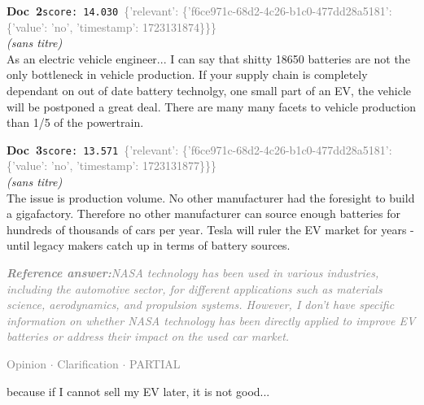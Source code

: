 \documentclass[a4paper,11pt]{article}
\begin{document}
\begin{docenv}
{\footnotesize\textcolor{doccolor}{\textbf{Doc~2}}}\hfill{\tiny\texttt{score:~14.030}}\ {\tiny\textcolor{gray}{\{'relevant': \{'f6ce971c-68d2-4c26-b1c0-477dd28a5181': \{'value': 'no', 'timestamp': 1723131874\}\}\}}}\\[3pt]
{\small\textit{(sans titre)}}\\[2pt]
\vspace{2pt}
{\footnotesize 
As an electric vehicle engineer... I can say that shitty 18650 batteries are not the only bottleneck in vehicle production. If your supply chain is completely dependant on out of date battery technolgy, one small part of an EV,  the vehicle will be postponed a great deal. There are many many facets to vehicle production than 1/5 of the powertrain.}
\end{docenv}
\begin{docenv}
{\footnotesize\textcolor{doccolor}{\textbf{Doc~3}}}\hfill{\tiny\texttt{score:~13.571}}\ {\tiny\textcolor{gray}{\{'relevant': \{'f6ce971c-68d2-4c26-b1c0-477dd28a5181': \{'value': 'no', 'timestamp': 1723131877\}\}\}}}\\[3pt]
{\small\textit{(sans titre)}}\\[2pt]
\vspace{2pt}
{\footnotesize 
The issue is production volume.   No other manufacturer had the foresight to build a gigafactory.   Therefore no other manufacturer can source enough batteries for hundreds of thousands of cars per year.   Tesla will ruler the EV market for years - until legacy makers catch up in terms of battery sources.}
\end{docenv}
\begin{refanswerenv}
{\footnotesize\textit{\textcolor{gray}{\textbf{Reference answer:}\enspace NASA technology has been used in various industries, including the automotive sector, for different applications such as materials science, aerodynamics, and propulsion systems. However, I don't have specific information on whether NASA technology has been directly applied to improve EV batteries or address their impact on the used car market.}}}
\end{refanswerenv}
\vspace{0.5em}
\hfill{\tiny\textcolor{gray}{Opinion $\cdot$ Clarification $\cdot$ PARTIAL}}
\begin{userbubble}
because if I cannot sell my EV later, it is not good...
\end{userbubble}
\end{document}
